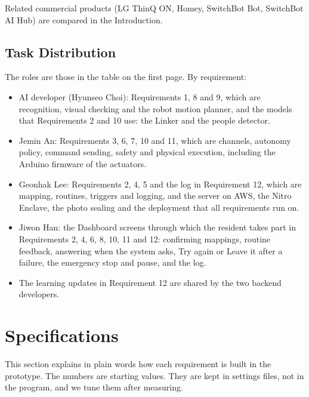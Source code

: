 \documentclass[conference]{IEEEtran}
\begin{document}
Related commercial products (LG ThinQ ON, Homey, SwitchBot Bot, SwitchBot AI Hub) are compared in the Introduction.

\subsection{Task Distribution}
The roles are those in the table on the first page. By requirement:
\begin{itemize}
\item AI developer (Hyunseo Choi): Requirements 1, 8 and 9, which are recognition, visual checking and the robot motion planner, and the models that Requirements 2 and 10 use: the Linker and the people detector.
\item Jemin An: Requirements 3, 6, 7, 10 and 11, which are channels, autonomy policy, command sending, safety and physical execution, including the Arduino firmware of the actuators.
\item Geonhak Lee: Requirements 2, 4, 5 and the log in Requirement 12, which are mapping, routines, triggers and logging, and the server on AWS, the Nitro Enclave, the photo sealing and the deployment that all requirements run on.
\item Jiwon Han: the Dashboard screens through which the resident takes part in Requirements 2, 4, 6, 8, 10, 11 and 12: confirming mappings, routine feedback, answering when the system asks, Try again or Leave it after a failure, the emergency stop and pause, and the log.
\item The learning updates in Requirement 12 are shared by the two backend developers.
\end{itemize}
\section{Specifications}
This section explains in plain words how each requirement is built in the prototype. The numbers are starting values. They are kept in settings files, not in the program, and we tune them after measuring.
\end{document}
